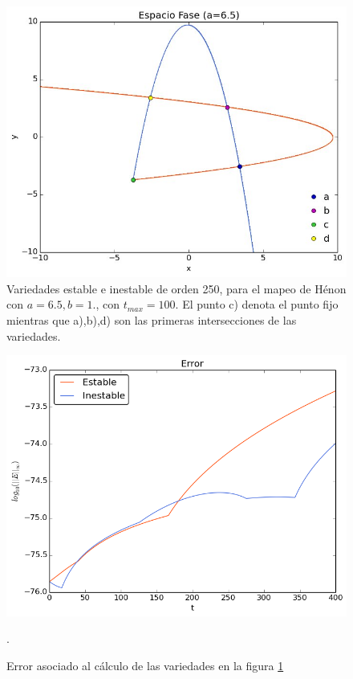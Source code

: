 \begin{figure}[H]
\centering
\includegraphics[scale=0.5]{rectangulo-fundamental}
\caption{Variedades estable e inestable de orden 250, para el mapeo de Hénon con $a=6.5,b=1.$, con $t_{max}=100$. El punto c) denota el punto fijo mientras que  a),b),d) son las primeras intersecciones de las variedades.}
\label{rectangulo0}
\end{figure}

\begin{figure}[H]
\centering
\includegraphics[scale=0.5]{error-rectangulo}
\caption{Error asociado al cálculo de las variedades en la figura \ref{rectangulo0}}.
\label{ErrorRectangulo0}
\end{figure} 

